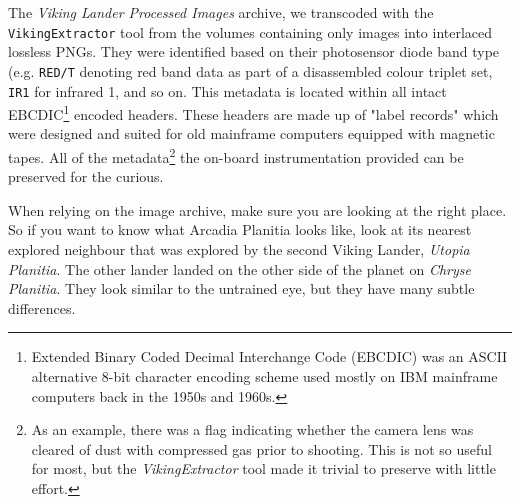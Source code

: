 The {\it Viking Lander Processed Images} archive, we transcoded with the {\tt VikingExtractor} tool from the volumes containing only images into interlaced lossless PNGs. They were identified based on their photosensor diode band type (e.g. {\tt RED/T} denoting red band data as part of a disassembled colour triplet set, {\tt IR1} for infrared 1, and so on. This metadata is located within all intact EBCDIC\footnote{Extended Binary Coded Decimal Interchange Code (EBCDIC) was an ASCII alternative 8-bit character encoding scheme used mostly on IBM mainframe computers back in the 1950s and 1960s.} encoded headers. These headers are made up of "label records" which were designed and suited for old mainframe computers equipped with magnetic tapes. All of the metadata\footnote{As an example, there was a flag indicating whether the camera lens was cleared of dust with compressed gas prior to shooting. This is not so useful for most, but the {\it VikingExtractor} tool made it trivial to preserve with little effort.} the on-board instrumentation provided can be preserved for the curious.

When relying on the image archive, make sure you are looking at the right place. So if you want to know what Arcadia Planitia looks like, look at its nearest explored neighbour that was explored by the second Viking Lander, {\it Utopia Planitia}. The other lander landed on the other side of the planet on {\it Chryse Planitia}. They look similar to the untrained eye, but they have many subtle differences.

\StopChapter

